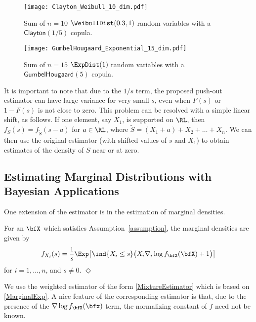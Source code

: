 \begin{figure}%
\caption{Sum of $n=10$ $\WeibullDist(0.3, 1)$ random variables with a $\mathsf{Clayton}(1/5)$ copula.}\vspace{3mm}
\centering
\texttt{[image: Clayton\_Weibull\_10\_dim.pdf]}
\label{fig:pushout_clayton}
\end{figure}


\begin{figure}%
\caption{Sum of $n=15$ $\ExpDist(1)$ random variables with a $\mathsf{GumbelHougaard}(5)$ copula.}\vspace{3mm}
\centering
\texttt{[image: GumbelHougaard\_Exponential\_15\_dim.pdf]}
\label{fig:pushout_gumbel}
\end{figure}

It is important to note that due to the $1/s$ term, the proposed push-out estimator can have large variance for very small $s$, even when $F(s)$ or $1 - F(s)$ is not  close to zero. This problem can be resolved with a simple linear shift, as follows.  If one element, say $X_1$, is supported on $\RL$, then $f_S(s) = f_{\tilde{S}}(s-a)$ for $a \in \RL$, where $\tilde{S} = (X_1+a) + X_2 + \dots + X_n$.  We can then use the original estimator (with shifted values of $s$ and $X_1$) to obtain estimates of the  density of $S$ near or at zero.


\subsection{Estimating Marginal Distributions with Bayesian Applications} \label{ssec:Marginals}
One extension of the estimator is in the estimation of marginal densities.

\begin{proposition} \label{lemma:MarginalDensity}
    For an $\bfX$ which satisfies Assumption~\ref{assumption}, the marginal densities are given by
    \begin{equation} \label{MarginalExp}
    f_{X_i}(s) = \frac1s \Exp \bigl[ \ind{ X_i \le s}  \bigl(X_i \nabla_i \log f_{\bfX}(\bfX) + 1 \bigr) \bigr]
    \end{equation}
    for $i=1,\dots,n$, and $s \not=0$. \hfill $\Diamond$
    \end{proposition}
We use the weighted estimator of the form \eqref{MixtureEstimator} which is based on \eqref{MarginalExp}. A nice feature of the corresponding estimator is that, due to the presence of the $\nabla \log f_{\bfX}(\bfx)$ term,  the normalizing constant of $f$ need not be known.



